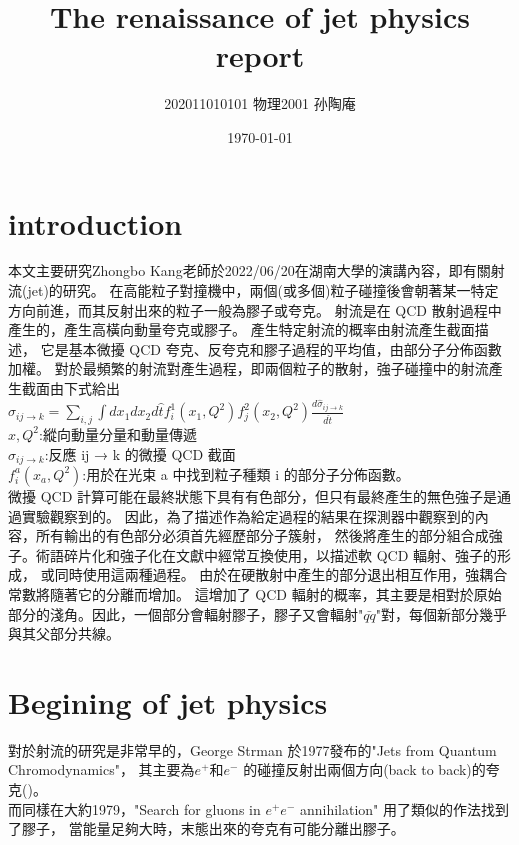 \documentclass[12pt, a4paper, oneside]{ctexart}
\title{The renaissance of jet physics report}
\date{\today}
\author{202011010101 物理2001 孙陶庵}
\begin{document}
\begin{spacing}{2.0}
\maketitle
\section{introduction}
本文主要研究Zhongbo Kang老師於2022/06/20在湖南大學的演講內容，即有關射流(jet)的研究。
在高能粒子對撞機中，兩個(或多個)粒子碰撞後會朝著某一特定方向前進，而其反射出來的粒子一般為膠子或夸克。
射流是在 QCD 散射過程中產生的，產生高橫向動量夸克或膠子。 產生特定射流的概率由射流產生截面描述，
它是基本微擾 QCD 夸克、反夸克和膠子過程的平均值，由部分子分佈函數加權。
對於最頻繁的射流對產生過程，即兩個粒子的散射，強子碰撞中的射流產生截面由下式給出\\
$\sigma_{i j \rightarrow k}=\sum_{i, j} \int d x_{1} d x_{2} d \hat{t} f_{i}^{1}\left(x_{1}, Q^{2}\right) f_{j}^{2}\left(x_{2}, Q^{2}\right) \frac{d \hat{\sigma}_{i j \rightarrow k}}{d \hat{t}}$\\
$x, Q^2$:縱向動量分量和動量傳遞\\
$\hat{\sigma}_{i j \rightarrow k}$:反應 ij → k 的微擾 QCD 截面\\
$f_{i}^{a}\left(x_{a}, Q^{2}\right)$:用於在光束 a 中找到粒子種類 i 的部分子分佈函數。\\
微擾 QCD 計算可能在最終狀態下具有有色部分，但只有最終產生的無色強子是通過實驗觀察到的。
因此，為了描述作為給定過程的結果在探測器中觀察到的內容，所有輸出的有色部分必須首先經歷部分子簇射，
然後將產生的部分組合成強子。術語碎片化和強子化在文獻中經常互換使用，以描述軟 QCD 輻射、強子的形成，
或同時使用這兩種過程。
由於在硬散射中產生的部分退出相互作用，強耦合常數將隨著它的分離而增加。
這增加了 QCD 輻射的概率，其主要是相對於原始部分的淺角。因此，一個部分會輻射膠子，膠子又會輻射"$\bar{qq}$"對，每個新部分幾乎與其父部分共線。

\section{Begining of jet physics}
對於射流的研究是非常早的，George Strman 於1977發布的"Jets from Quantum Chromodynamics"\cite{PhysRevLett.39.1436}，
其主要為$e^+$和$e^-$ 的碰撞反射出兩個方向(back to back)的夸克()。\\
而同樣在大約1979，"Search for gluons in $e^+e^-$ annihilation"\cite{ELLIS1976253} 用了類似的作法找到了膠子，
當能量足夠大時，末態出來的夸克有可能分離出膠子。


\end{spacing}
\end{document}
